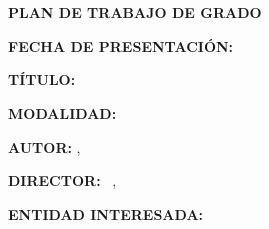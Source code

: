 
\renewcommand{\contentsname}{\hfill\bfseries\normalsize \MakeUppercase{Tabla de Contenido}\hfill}
\renewcommand{\cftaftertoctitle}{\hfill}

\begin{titlepage}

	\begin{center}

		\textbf{\MakeUppercase{\Uni}} \\
		\textbf{\MakeUppercase{\Fac}} \\
		\textbf{\MakeUppercase{\Esc}}

		\skipline

		\textbf{PLAN DE TRABAJO DE GRADO}

		\skipline
		\skipline

	\end{center}


	\textbf{FECHA DE PRESENTACIÓN: } \CiudadFecha

	\textbf{TÍTULO: } \Tit

	\textbf{MODALIDAD: } \Mod

	\textbf{AUTOR: } \Nam, \Cod

	\textbf{DIRECTOR: } \TDir\ \Dir, \EDir

	\textbf{ENTIDAD INTERESADA: } \EntI

\end{titlepage}

\tableofcontents

\pagebreak
\begin{center}
	\MakeUppercase{\textbf{ \Tit}}
\end{center}

